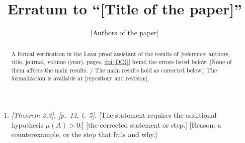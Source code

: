 \documentclass[11pt]{amsart}
\title[Erratum]{Erratum to ``[Title of the paper]''}
\author{[Authors of the paper]}
\date{}
\begin{document}
\begin{abstract}
A formal verification in the Lean proof assistant of the results of
[reference: authors, title, journal, volume (year), pages,
\href{https://doi.org/[DOI]}{doi:[DOI]}] found the errors listed below.
[None of them affects the main results. / The main results hold as corrected
below.] The formalization is available at [repository and revision].
\end{abstract}

\maketitle

\begin{enumerate}
\item \emph{[Theorem 2.3], [p.~12, l.~5].}
  [The statement requires the additional hypothesis $\mu(A) > 0$:]
  [the corrected statement or step.]
  [Reason: a counterexample, or the step that fails and why.]
\end{enumerate}
\end{document}
